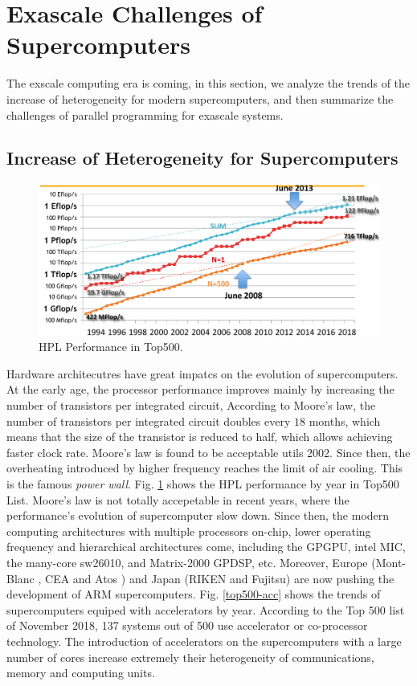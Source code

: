 \section{Exascale Challenges of Supercomputers}\label{Exascale Challenges of Supercomputers}

The exscale computing era is coming, in this section, we analyze the trends of the increase of heterogeneity for modern supercomputers, and then summarize the challenges of parallel programming for exascale systems.

\subsection{Increase of Heterogeneity for Supercomputers} \label{Trends of Heterogeneity}

\begin{figure}[t]
	\centering
	\includegraphics[width=6.3in]{fig/top500_2.pdf}
	\caption{HPL Performance in Top500.}
	\label{hpc_evaluate}
\end{figure}

Hardware architecutres have great impatcs on the evolution of supercomputers. At the early age, the processor performance improves mainly by increasing the number of transistors per integrated circuit, According to Moore's law, the number of transistors per integrated circuit doubles every $18$ months, which means that the size of the transistor is reduced to half, which allows achieving faster clock rate. Moore's law is found to be acceptable utils 2002. Since then, the overheating introduced by higher frequency reaches the limit of air cooling. This is the famous \textit{power wall}. Fig. \ref{hpc_evaluate} shows the HPL performance by year in Top500 List. Moore's law is not totally accepetable in recent years, where the performance's evolution of supercomputer slow down. Since then, the modern computing architectures with multiple processors on-chip, lower operating frequency and hierarchical architectures come, including the GPGPU, intel MIC, the many-core sw26010, and Matrix-2000 GPDSP, etc. Moreover, Europe (Mont-Blanc \cite{rajovic2016mont}, CEA and Atos \cite{ceaarm}) and Japan (RIKEN and Fujitsu) \cite{japanarm} are now pushing the development of ARM supercomputers. Fig. \ref{top500-acc} shows the trends of supercomputers equiped with accelerators by year. According to the Top 500 list of November 2018, 137 systems out of 500 use accelerator or co-processor technology. The introduction of accelerators on the supercomputers with a large number of cores increase extremely their heterogeneity of communications, memory and computing units.


